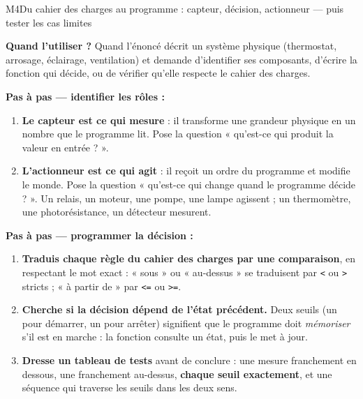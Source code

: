 \begin{fichemethode}{M4}{Du cahier des charges au programme : capteur, décision, actionneur --- puis tester les cas limites}

\textbf{Quand l'utiliser ?} Quand l'énoncé décrit un système physique (thermostat,
arrosage, éclairage, ventilation) et demande d'identifier ses composants, d'écrire la
fonction qui décide, ou de vérifier qu'elle respecte le cahier des charges.

\textbf{Pas à pas --- identifier les rôles :}
\begin{enumerate}
  \item \textbf{Le capteur est ce qui mesure} : il transforme une grandeur physique en un
        nombre que le programme lit. Pose la question « qu'est-ce qui produit la valeur en
        entrée ? ».
  \item \textbf{L'actionneur est ce qui agit} : il reçoit un ordre du programme et modifie
        le monde. Pose la question « qu'est-ce qui change quand le programme décide ? ».
        Un relais, un moteur, une pompe, une lampe agissent ; un thermomètre, une
        photorésistance, un détecteur mesurent.
\end{enumerate}

\textbf{Pas à pas --- programmer la décision :}
\begin{enumerate}
  \item \textbf{Traduis chaque règle du cahier des charges par une comparaison}, en
        respectant le mot exact : « sous » ou « au-dessus » se traduisent par \lstinline{<}
        ou \lstinline{>} stricts ; « à partir de » par \lstinline{<=} ou \lstinline{>=}.
  \item \textbf{Cherche si la décision dépend de l'état précédent.} Deux seuils (un pour
        démarrer, un pour arrêter) signifient que le programme doit \emph{mémoriser} s'il est
        en marche : la fonction consulte un état, puis le met à jour.
  \item \textbf{Dresse un tableau de tests} avant de conclure : une mesure franchement en
        dessous, une franchement au-dessus, \textbf{chaque seuil exactement}, et une
        séquence qui traverse les seuils dans les deux sens.
\end{enumerate}


\end{fichemethode}
